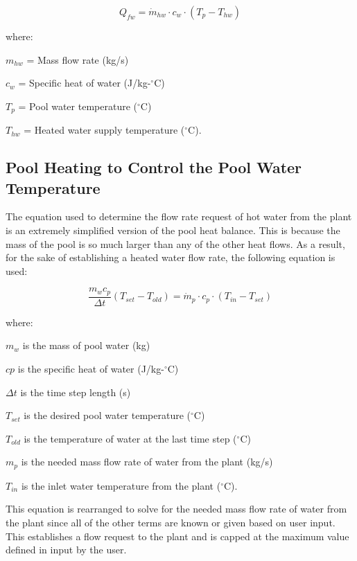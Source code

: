 \begin{equation}
Q_{fw} = \dot{m}_{hw} \cdot c_w \cdot (T_p - T_{hw})
\end{equation}

where:

\(m_{hw}\) = Mass flow rate (kg/s)

\(c_w\) = Specific heat of water (J/kg-\(^{\circ}\)C)

\(T_p\) = Pool water temperature (\(^{\circ}\)C)

\(T_{hw}\) = Heated water supply temperature (\(^{\circ}\)C).

\subsection{Pool Heating to Control the Pool Water Temperature}\label{pool-heating-to-control-the-pool-water-temperature}

The equation used to determine the flow rate request of hot water from the plant is an extremely simplified version of the pool heat balance. This is because the mass of the pool is so much larger than any of the other heat flows. As a result, for the sake of establishing a heated water flow rate, the following equation is used:

\begin{equation}
\frac{m_w c_p}{\Delta t} (T_{set}-T_{old}) = \dot{m}_p \cdot c_p \cdot (T_{in} - T_{set} )
\end{equation}

where:

\(m_w\) is the mass of pool water (kg)

\(cp\) is the specific heat of water (J/kg-\(^{\circ}\)C)

\(\Delta t\) is the time step length (s)

\(T_{set}\) is the desired pool water temperature (\(^{\circ}\)C)

\(T_{old}\) is the temperature of water at the last time step (\(^{\circ}\)C)

\(m_p\) is the needed mass flow rate of water from the plant (kg/s)

\(T_{in}\) is the inlet water temperature from the plant (\(^{\circ}\)C).

This equation is rearranged to solve for the needed mass flow rate of water from the plant since all of the other terms are known or given based on user input. This establishes a flow request to the plant and is capped at the maximum value defined in input by the user.

